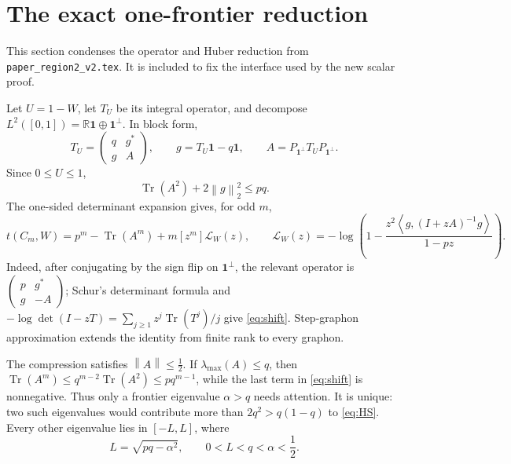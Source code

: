 \documentclass[11pt]{article}
\newcommand{\one}{\mathbf 1}
\newcommand{\Tr}{\operatorname{Tr}}
\newcommand{\ip}[2]{\left\langle #1,#2\right\rangle}
\newcommand{\norm}[1]{\left\lVert #1\right\rVert}
\newcommand{\cL}{\mathcal L}
\begin{document}
\section{The exact one-frontier reduction}\label{sec:reduction}

This section condenses the operator and Huber reduction from
\texttt{paper\_region2\_v2.tex}.  It is included to fix the interface used by
the new scalar proof.

Let $U=1-W$, let $T_U$ be its integral operator, and decompose
$L^2([0,1])=\mathbb R\one\oplus\one^\perp$.  In block form,
\begin{equation}\label{eq:block}
        T_U=
        \begin{pmatrix}q&g^*\\ g&A\end{pmatrix},
        \qquad
        g=T_U\one-q\one,
        \qquad
        A=P_{\one^\perp}T_UP_{\one^\perp}.
\end{equation}
Since $0\le U\le1$,
\begin{equation}\label{eq:HS}
        \Tr(A^2)+2\norm g_2^2\le pq.
\end{equation}
The one-sided determinant expansion gives, for odd $m$,
\begin{equation}\label{eq:shift}
 t(C_m,W)=p^m-\Tr(A^m)+m[z^m]\cL_W(z),
 \qquad
 \cL_W(z)=-\log\!\left(
 1-\frac{z^2\ip g{(I+zA)^{-1}g}}{1-pz}
 \right).
\end{equation}
Indeed, after conjugating by the sign flip on $\one^\perp$, the relevant
operator is
$\left(\begin{smallmatrix}p&g^*\\g&-A\end{smallmatrix}\right)$; Schur's
determinant formula and
$-\log\det(I-zT)=\sum_{j\ge1}z^j\Tr(T^j)/j$ give
\eqref{eq:shift}.  Step-graphon approximation extends the identity from
finite rank to every graphon.

The compression satisfies $\norm A\le\tfrac12$.  If
$\lambda_{\max}(A)\le q$, then
$\Tr(A^m)\le q^{m-2}\Tr(A^2)\le pq^{m-1}$, while the last term in
\eqref{eq:shift} is nonnegative.  Thus only a frontier eigenvalue
$\alpha>q$ needs attention.  It is unique: two such eigenvalues would
contribute more than $2q^2>q(1-q)$ to \eqref{eq:HS}.  Every other eigenvalue
lies in $[-L,L]$, where
\begin{equation}\label{eq:L}
        L=\sqrt{pq-\alpha^2},
        \qquad 0<L<q<\alpha<\frac12.
\end{equation}
\end{document}
